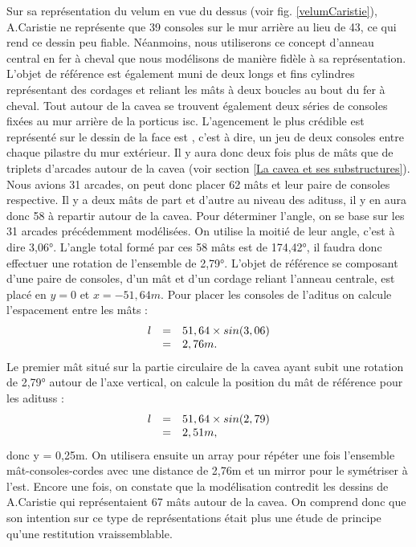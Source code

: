 Sur sa représentation du \gls{velum} en vue du dessus (voir fig. \ref{velumCaristie}), A.Caristie ne représente que 39 consoles sur le mur arrière au lieu de 43, ce qui rend ce dessin peu fiable. Néanmoins, nous utiliserons ce concept d'anneau central en fer à cheval que nous modélisons de manière fidèle à sa représentation. L'objet de référence est également muni de deux longs et fins cylindres représentant des cordages et reliant les mâts à deux boucles au bout du fer à cheval.
Tout autour de la \gls{cavea} se trouvent également deux séries de consoles fixées au mur arrière de la \gls{porticus isc}. L'agencement le plus crédible est représenté sur le dessin de la face est \cite[Pl. IV]{orangePl}, c'est à dire, un jeu de deux consoles entre chaque \gls{pilastre} du mur extérieur. Il y aura donc deux fois plus de mâts que de triplets d'arcades autour de la \gls{cavea} (voir section \ref{La cavea et ses substructures}). Nous avions 31 arcades, on peut donc placer 62 mâts et leur paire de consoles respective. Il y a deux mâts de part et d'autre au niveau des \glspl{aditus}, il y en aura donc 58 à repartir autour de la \gls{cavea}. Pour déterminer l'angle, on se base sur les 31 arcades précédemment modélisées. On utilise la moitié de leur angle, c'est à dire 3,06°. L'angle total formé par ces 58 mâts est de 174,42°, il faudra donc effectuer une rotation de l'ensemble de 2,79°. L'objet de référence se composant d'une paire de consoles, d'un mât et d'un cordage reliant l'anneau centrale, est placé en $y=0$ et $x=-51,64m$. Pour placer les consoles de l'\gls{aditus} on calcule l'espacement entre les mâts :
\begin{equation}
	\begin{array}{r c l}
	l &=&  51,64 \times sin(3,06) \\ 
	 &=& 2,76m.
	 \end{array}
\end{equation}
Le premier mât situé sur la partie circulaire de la \gls{cavea} ayant subit une rotation de 2,79° autour de l'axe vertical, on calcule la position du mât de référence pour les \glspl{aditus} :
\begin{equation}
	\begin{array}{r c l}
		l & = & 51,64 \times sin(2,79) \\
		 &= & 2,51m,
	\end{array}
\end{equation}
donc y = 0,25m. On utilisera ensuite un \gls{array} pour répéter une fois l'ensemble mât-consoles-cordes avec une distance de 2,76m et un \gls{mirror} pour le symétriser à l'est. Encore une fois, on constate que la modélisation contredit les dessins de A.Caristie qui représentaient 67 mâts autour de la \gls{cavea}. On comprend donc que son intention sur ce type de représentations était plus une étude de principe qu'une restitution vraissemblable.

